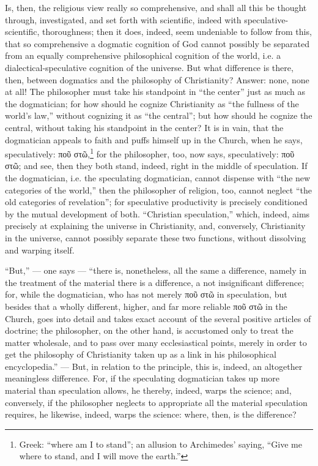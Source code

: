 \documentclass[12pt]{book}
\begin{document}
Is, then, the religious view really so comprehensive, and shall all this be thought through, investigated, and set forth with scientific, indeed with speculative-scientific, thoroughness; then
it does, indeed, seem undeniable to follow from this, that so comprehensive a dogmatic cognition of God cannot possibly be separated from an equally comprehensive philosophical cognition of the world, i.e. a dialectical-speculative cognition of the universe. But what difference is there, then, between dogmatics and the philosophy of Christianity? Answer: none, none at all! The philosopher must take his standpoint in ``the center'' just as much as the dogmatician; for how should he cognize Christianity as ``the fullness of the world's law,'' without cognizing it as ``the central''; but how should he cognize the central, without taking his standpoint in the center? It is in vain, that the dogmatician appeals to faith and puffs himself up in the Church, when he
says, speculatively: ποῦ στῶ,\footnote{Greek: ``where am I to stand''; an allusion to Archimedes' saying, ``Give me where to stand, and I will move the earth.''} for the philosopher, too, now says, speculatively: ποῦ στῶ; and see, then they both stand, indeed, right in the middle of speculation. If the dogmatician, i.e. the speculating dogmatician, cannot dispense with ``the new categories of the world,'' then the philosopher of religion, too, cannot neglect ``the old categories of revelation''; for speculative productivity is precisely conditioned by the mutual development of both. ``Christian speculation,'' which, indeed, aims precisely at explaining the universe in Christianity, and, conversely, Christianity in the universe, cannot possibly separate these two functions, without dissolving and warping itself.

``But,'' --- one says --- ``there is, nonetheless, all the same a difference, namely in the treatment of the material there is a difference, a not insignificant difference; for, while the dogmatician, who has not merely ποῦ στῶ in speculation, but besides
that a wholly different, higher, and far more reliable ποῦ στῶ in the Church, goes into detail and takes exact account of the several positive articles of doctrine; the philosopher, on the other hand, is accustomed only to treat the matter wholesale, and to pass over many ecclesiastical points, merely in order to get the philosophy of Christianity taken up as a link in his philosophical encyclopedia.'' --- But, in relation to the principle, this is, indeed, an altogether meaningless difference. For, if the speculating dogmatician takes up more material than speculation allows, he thereby, indeed, warps the science; and, conversely, if the philosopher neglects to appropriate all the material speculation requires, he likewise, indeed, warps the science: where, then, is the difference?
\end{document}
